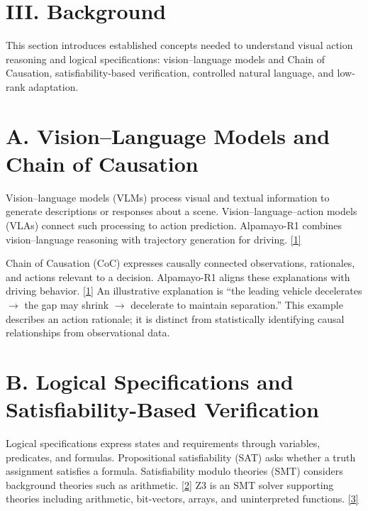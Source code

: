 \documentclass[11pt,a4paper]{article}
\begin{document}
\section*{III. Background}


This section introduces established concepts needed to understand visual action reasoning and logical specifications: vision–language models and Chain of Causation, satisfiability-based verification, controlled natural language, and low-rank adaptation.\par

\section*{A. Vision–Language Models and Chain of Causation}

Vision–language models (VLMs) process visual and textual information to generate descriptions or responses about a scene. Vision–language–action models (VLAs) connect such processing to action prediction. Alpamayo-R1 combines vision–language reasoning with trajectory generation for driving. \href{\detokenize{https://arxiv.org/abs/2511.00088}}{[1]}\par

Chain of Causation (CoC) expresses causally connected observations, rationales, and actions relevant to a decision. Alpamayo-R1 aligns these explanations with driving behavior. \href{\detokenize{https://arxiv.org/abs/2511.00088}}{[1]} An illustrative explanation is “the leading vehicle decelerates \ensuremath{\rightarrow} the gap may shrink \ensuremath{\rightarrow} decelerate to maintain separation.” This example describes an action rationale; it is distinct from statistically identifying causal relationships from observational data.\par

\section*{B. Logical Specifications and Satisfiability-Based Verification}

Logical specifications express states and requirements through variables, predicates, and formulas. Propositional satisfiability (SAT) asks whether a truth assignment satisfies a formula. Satisfiability modulo theories (SMT) considers background theories such as arithmetic. \href{\detokenize{https://theory.stanford.edu/~barrett/pubs/BT18.pdf}}{[2]} Z3 is an SMT solver supporting theories including arithmetic, bit-vectors, arrays, and uninterpreted functions. \href{\detokenize{https://doi.org/10.1007/978-3-540-78800-3_24}}{[3]}\par
\end{document}
